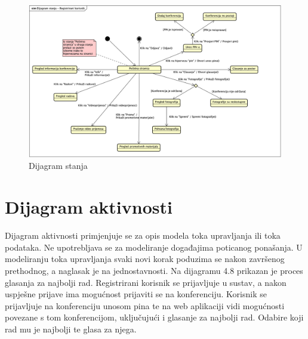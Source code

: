 			\begin{figure}[H]
				\includegraphics[scale=0.4]{dijagrami/dijagram_stanja.png} %
				\centering
				\caption{Dijagram stanja}
				\label{fig:promjene3}
			\end{figure}			
			
			
			\eject 
		
		\section{Dijagram aktivnosti}
			
			Dijagram aktivnosti primjenjuje se za opis modela toka upravljanja ili toka podataka. Ne upotrebljava se za modeliranje događajima poticanog ponašanja. U modeliranju toka upravljanja svaki novi korak poduzima se nakon završenog prethodnog, a naglasak je na jednostavnosti. Na dijagramu 4.8 prikazan je proces glasanja za najbolji rad. Registrirani korisnik se prijavljuje u sustav, a nakon uspješne prijave ima mogućnost prijaviti se na konferenciju. Korisnik se prijavljuje na konferenciju unosom pina te na web aplikaciji vidi mogućnosti povezane s tom konferencijom, uključujući i glasanje za najbolji rad. Odabire koji rad mu je najbolji te glasa za njega. 
			

